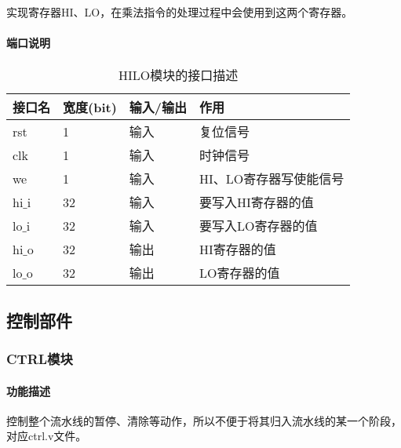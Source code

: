 \quad

实现寄存器HI、LO，在乘法指令的处理过程中会使用到这两个寄存器。
\paragraph{端口说明}
\quad

\quad
\begin{table}[H]
	\centering
	\caption{HILO模块的接口描述}
	\begin{tabular}{|l|l|l|l|}
		\hline
		接口名 & 宽度(bit) & 输入/输出 & 作用 \\
		\hline
		rst & 1 & 输入 & 复位信号 \\
		\hline
		clk & 1 & 输入 & 时钟信号 \\
		\hline
		we & 1 & 输入 & HI、LO寄存器写使能信号 \\
		\hline
		hi$\_$i & 32 & 输入 & 要写入HI寄存器的值 \\
		\hline
		lo$\_$i & 32 & 输入 & 要写入LO寄存器的值 \\
		\hline
		hi$\_$o & 32 & 输出 & HI寄存器的值 \\
		\hline
		lo$\_$o & 32 & 输出 & LO寄存器的值 \\
		\hline
	\end{tabular}
\end{table}
\subsection{控制部件}
\subsubsection{CTRL模块}
\paragraph{功能描述}
\quad

\quad

控制整个流水线的暂停、清除等动作，所以不便于将其归入流水线的某一个阶段，对应ctrl.v文件。

